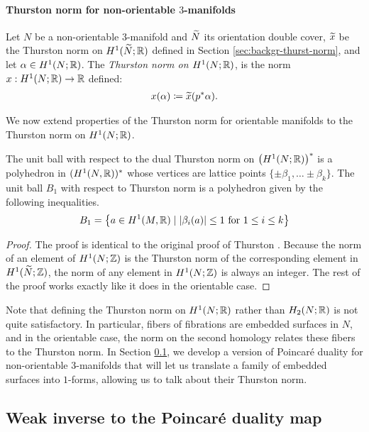 \paragraph{Thurston norm for non-orientable $3$-manifolds}
  Let $N$ be a non-orientable 3-manifold and $\widetilde{N}$ its orientation double cover, $\widetilde{x}$ be the Thurston norm on $H^1(\widetilde{N};\mathbb{R})$ defined in Section \ref{sec:backgr-thurst-norm}, and let $\alpha \in H^1(N;\mathbb{R})$.
  The \emph{Thurston norm on $H^1(N; \mathbb{R})$}, is the norm $x: H^1(N;\mathbb{R}) \rightarrow \mathbb{R}$ defined:
  \begin{align*}
    x(\alpha) \coloneqq \widetilde{x}(p^{\ast}\alpha).
  \end{align*}

We now extend properties of the Thurston norm for orientable manifolds to the Thurston norm on $H^1(N;\mathbb{R})$.
\begin{thm}
  The unit ball with respect to the dual Thurston norm on $\left( H^1(N; \mathbb{R}) \right)^{\ast}$ is a polyhedron in $(H^1(N,\mathbb{R}))^\ast$ whose vertices are lattice points $\{\pm \beta_1, \ldots \pm \beta_k\}$.
  The unit ball $B_1$ with respect to Thurston norm is a polyhedron given by the following inequalities.
  \begin{align*}
    B_1 = \left\{ a\in H^1(M,\mathbb{R}) \mid \left| \beta_i(a) \right| \leq 1 \text{ for $1\leq i \leq k$} \right\}
  \end{align*}
\end{thm}

\begin{proof}
  The proof is identical to the original proof of Thurston \cite[Theorem 2]{thurston1986norm}.
  Because the norm of an element of $H^1(N; \mathbb{Z})$ is the Thurston norm of the corresponding element in $H^1(\widetilde{N}; \mathbb{Z})$, the norm of any element in $H^1(N; \mathbb{Z})$ is always an integer.
  The rest of the proof works exactly like it does in the orientable case.
\end{proof}

Note that defining the Thurston norm on $H^1(N; \mathbb{R})$ rather than $H_2(N; \mathbb{R})$ is not quite satisfactory.
In particular, fibers of fibrations are embedded surfaces in $N$, and in the orientable case, the norm on the second homology relates these fibers to the Thurston norm.
In Section \ref{sec:weak-inverse-poinc}, we develop a version of Poincar\'e duality for non-orientable 3-manifolds that will let us translate a family of embedded surfaces into $1$-forms, allowing us to talk about their Thurston norm.

\subsection{Weak inverse to the Poincar\'e duality map}
\label{sec:weak-inverse-poinc}

